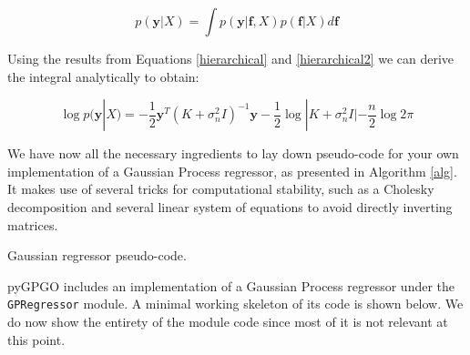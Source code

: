 \documentclass[10pt,a4paper,twoside]{book}
\begin{document}
\begin{equation}
p(\boldsymbol{y}|X) = \int p(\boldsymbol{y}|\boldsymbol{f}, X)p(\boldsymbol{f}|X) d\boldsymbol{f}
\end{equation}

Using the results from Equations \ref{hierarchical} and \ref{hierarchical2} we can derive the integral analytically to obtain:

\begin{equation}
\log p(\boldsymbol{y}|X) = - \dfrac{1}{2}\boldsymbol{y}^T(K + \sigma^2_n I)^{-1}\boldsymbol{y} - \dfrac{1}{2}\log |K + \sigma^2_n I| - \dfrac{n}{2}\log 2\pi
\end{equation}

We have now all the necessary ingredients to lay down pseudo-code for your own implementation of a Gaussian Process regressor, as presented in Algorithm \ref{alg}. It makes use of several tricks for computational stability, such as a Cholesky decomposition and several linear system of equations to avoid directly inverting matrices.\\

\begin{algorithm}
	\caption{Gaussian regressor pseudo-code.}
		\label{alg}
		\begin{algorithmic}[1]
			\EndFunction
		\end{algorithmic}
\end{algorithm}

pyGPGO includes an implementation of a Gaussian Process regressor under the \texttt{GPRegressor} module. A minimal working skeleton of its code is shown below. We do now show the entirety of the module code since most of it is not relevant at this point.
\end{document}
